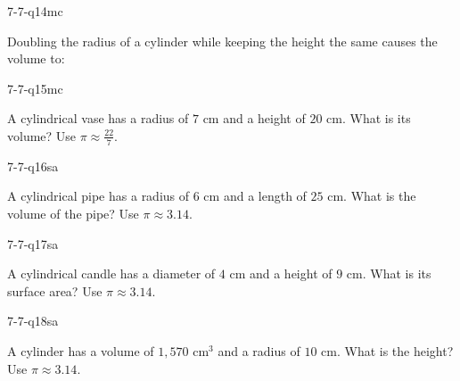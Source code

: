 \begin{practiceQuestion}{7-7-q14}{mc}
\begin{questionText}
Doubling the radius of a cylinder while keeping the height the same causes the volume to:
\end{questionText}
\end{practiceQuestion}

\begin{practiceQuestion}{7-7-q15}{mc}
\begin{questionText}
A cylindrical vase has a radius of $7$ cm and a height of $20$ cm. What is its volume? Use $\pi \approx \frac{22}{7}$.
\end{questionText}
\end{practiceQuestion}


\begin{practiceQuestion}{7-7-q16}{sa}
\begin{questionText}
A cylindrical pipe has a radius of $6$ cm and a length of $25$ cm. What is the volume of the pipe? Use $\pi \approx 3.14$.
\end{questionText}
\end{practiceQuestion}

\begin{practiceQuestion}{7-7-q17}{sa}
\begin{questionText}
A cylindrical candle has a diameter of $4$ cm and a height of $9$ cm. What is its surface area? Use $\pi \approx 3.14$.
\end{questionText}
\end{practiceQuestion}

\begin{practiceQuestion}{7-7-q18}{sa}
\begin{questionText}
A cylinder has a volume of $1{,}570$ cm$^3$ and a radius of $10$ cm. What is the height? Use $\pi \approx 3.14$.
\end{questionText}
\end{practiceQuestion}

